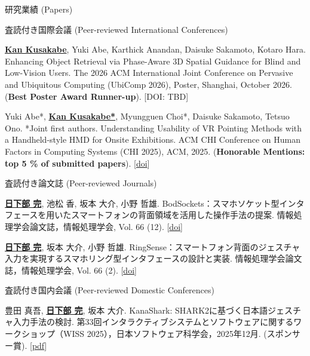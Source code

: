 \documentclass[
	11pt, %
]{resume} %
\begin{document}
\begin{rSection}{研究業績 (Papers)}
    
	\begin{rSubsection}{査読付き国際会議 (Peer-reviewed International Conferences)}{}{}{}
        \item \underline{\textbf{Kan Kusakabe}}, Yuki Abe, Karthick Anandan, Daisuke Sakamoto, Kotaro Hara. Enhancing Object Retrieval via Phase-Aware 3D Spatial Guidance for Blind and Low-Vision Users. The 2026 ACM International Joint Conference on Pervasive and Ubiquitous Computing (UbiComp 2026), Poster, Shanghai, October 2026. (\textbf{Best Poster Award Runner-up}). [DOI: TBD]
        \item Yuki Abe*, \underline{\textbf{Kan Kusakabe*}}, Myungguen Choi*, Daisuke Sakamoto, Tetsuo Ono. *Joint first authors. Understanding Usability of VR Pointing Methods with a Handheld-style HMD for Onsite Exhibitions. ACM CHI Conference on Human Factors in Computing Systems (CHI 2025), ACM, 2025. (\textbf{Honorable Mentions: top 5 \% of submitted papers}). [\href{https://doi.org/10.1145/3706598.3713874}{doi}]
    \end{rSubsection}

    \begin{rSubsection}{査読付き論文誌 (Peer-reviewed Journals)}{}{}{}
		\item \underline{\textbf{日下部 完}}, 池松 香, 坂本 大介, 小野 哲雄. BodSockets：スマホソケット型インタフェースを用いたスマートフォンの背面領域を活用した操作手法の提案. 情報処理学会論文誌，情報処理学会, Vol. 66 (12). [\href{https://doi.org/10.20729/0002006344}{doi}]
        
		\item \underline{\textbf{日下部 完}}, 坂本 大介, 小野 哲雄. RingSense：スマートフォン背面のジェスチャ入力を実現するスマホリング型インタフェースの設計と実装. 情報処理学会論文誌，情報処理学会, Vol. 66 (2). [\href{https://doi.org/10.20729/0002000028}{doi}]
    \end{rSubsection}

    \begin{rSubsection}{査読付き国内会議 (Peer-reviewed Domestic Conferences)}{}{}{}
		\item 豊田 真吾, \underline{\textbf{日下部 完}}, 坂本 大介. KanaShark: SHARK2に基づく日本語ジェスチャ入力手法の検討. 第33回インタラクティブシステムとソフトウェアに関するワークショップ（WISS 2025），日本ソフトウェア科学会，2025年12月. (スポンサー賞). [\href{www.wiss.org/WISS2025/downloads/proceedings.pdf}{pdf}]
        

\end{rSubsection}
\end{rSection}
\end{document}
